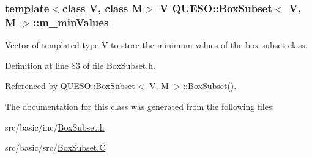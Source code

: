 \hypertarget{class_q_u_e_s_o_1_1_box_subset_a633a4fbfa03590b38e4d2b192f3cc2b5}{
\subsubsection[{m\-\_\-min\-Values}]{\setlength{\rightskip}{0pt plus 5cm}template$<$class V, class M$>$ V {\bf Q\-U\-E\-S\-O\-::\-Box\-Subset}$<$ V, M $>$\-::m\-\_\-min\-Values\hspace{0.3cm}{\ttfamily [protected]}}}\label{class_q_u_e_s_o_1_1_box_subset_a633a4fbfa03590b38e4d2b192f3cc2b5}


\hyperlink{class_q_u_e_s_o_1_1_vector}{Vector} of templated type {\ttfamily V} to store the minimum values of the box subset class. 



Definition at line 83 of file Box\-Subset.\-h.



Referenced by Q\-U\-E\-S\-O\-::\-Box\-Subset$<$ V, M $>$\-::\-Box\-Subset().



The documentation for this class was generated from the following files\-:\begin{DoxyCompactItemize}
\item 
src/basic/inc/\hyperlink{_box_subset_8h}{Box\-Subset.\-h}\item 
src/basic/src/\hyperlink{_box_subset_8_c}{Box\-Subset.\-C}\end{DoxyCompactItemize}

